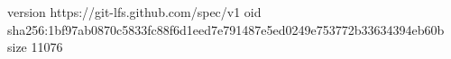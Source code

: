 version https://git-lfs.github.com/spec/v1
oid sha256:1bf97ab0870c5833fc88f6d1eed7e791487e5ed0249e753772b33634394eb60b
size 11076
